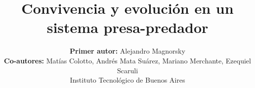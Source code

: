 \documentclass[journal, monochrome]{IEEEtran}
\begin{document}
%
\title{Convivencia y evolución en un sistema presa-predador}
%
%
%

\author{\textbf{Primer autor:}	Alejandro Magnorsky\\
		\textbf{Co-autores:}	Matías Colotto,
								Andrés Mata Suárez,
								Mariano Merchante,
								Ezequiel Scaruli \\[5px]
        Instituto Tecnológico de Buenos Aires}
        
% 
%



% 
\end{document}
